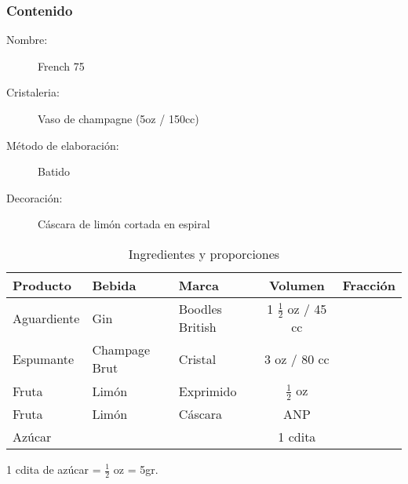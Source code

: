 \bigskip 
\bigskip 
 
\subsubsection{Contenido}
\bigskip 
\begin{description}
\item[Nombre:] French 75
\item[Cristaleria:] Vaso de champagne (5oz / 150cc)
\item[M\'etodo de elaboraci\'on:] Batido
\item[Decoraci\'on:] C\'ascara de lim\'on cortada en espiral
\end{description}

\begin{table}[h]
\caption{Ingredientes y proporciones} 
\label{tab:fonts}
\begin{center}       
\begin{tabular}{|l|l|l|c|l|} %
\hline
\rule[-1ex]{0pt}{3.5ex}  \textbf{Producto} & \textbf{Bebida} & \textbf{Marca} & \textbf{Volumen} & \textbf{Fracci\'on}  \\
\hline
\rule[-1ex]{0pt}{3.5ex}  Aguardiente & Gin 			& Boodles British 		& 1 $\frac{1}{2}$ oz / 45 cc 	&  	\\
\hline
\rule[-1ex]{0pt}{3.5ex}  Espumante	& Champage Brut 	& Cristal 				& 3 oz / 80 cc 		&  	\\
\hline
\rule[-1ex]{0pt}{3.5ex}  Fruta 		& Lim\'on	 	& Exprimido				& $\frac{1}{2}$	oz		& 	\\
\hline
\rule[-1ex]{0pt}{3.5ex}  Fruta 		& Lim\'on	 	& C\'ascara				& ANP			& 	\\
\hline
\rule[-1ex]{0pt}{3.5ex}  Az\'ucar 		& 			 	& 					& 1 cdita		& 	\\
\hline
\end{tabular}
\end{center}
\end{table} 
1 cdita de az\'ucar = $\frac{1}{2}$ oz = 5gr.
\bigskip 

